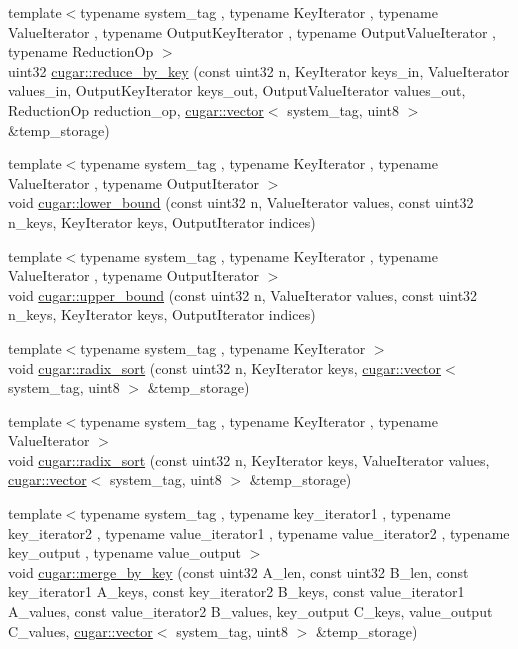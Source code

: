 \begin{DoxyCompactItemize}
\item 
{\footnotesize template$<$typename system\+\_\+tag , typename Key\+Iterator , typename Value\+Iterator , typename Output\+Key\+Iterator , typename Output\+Value\+Iterator , typename Reduction\+Op $>$ }\\uint32 \hyperlink{group___primitives_ga67aba73e3ceb623f48b734cb19889f1d}{cugar\+::reduce\+\_\+by\+\_\+key} (const uint32 n, Key\+Iterator keys\+\_\+in, Value\+Iterator values\+\_\+in, Output\+Key\+Iterator keys\+\_\+out, Output\+Value\+Iterator values\+\_\+out, Reduction\+Op reduction\+\_\+op, \hyperlink{structcugar_1_1vector}{cugar\+::vector}$<$ system\+\_\+tag, uint8 $>$ \&temp\+\_\+storage)
\item 
{\footnotesize template$<$typename system\+\_\+tag , typename Key\+Iterator , typename Value\+Iterator , typename Output\+Iterator $>$ }\\void \hyperlink{group___primitives_ga9dafac99df89cdd69ff33b9351e8cf7e}{cugar\+::lower\+\_\+bound} (const uint32 n, Value\+Iterator values, const uint32 n\+\_\+keys, Key\+Iterator keys, Output\+Iterator indices)
\item 
{\footnotesize template$<$typename system\+\_\+tag , typename Key\+Iterator , typename Value\+Iterator , typename Output\+Iterator $>$ }\\void \hyperlink{group___primitives_ga56b7c8a32a7a8a42afe413b087159230}{cugar\+::upper\+\_\+bound} (const uint32 n, Value\+Iterator values, const uint32 n\+\_\+keys, Key\+Iterator keys, Output\+Iterator indices)
\item 
{\footnotesize template$<$typename system\+\_\+tag , typename Key\+Iterator $>$ }\\void \hyperlink{group___primitives_gac4584fb9407d3d12ff3a4a1890e9b903}{cugar\+::radix\+\_\+sort} (const uint32 n, Key\+Iterator keys, \hyperlink{structcugar_1_1vector}{cugar\+::vector}$<$ system\+\_\+tag, uint8 $>$ \&temp\+\_\+storage)
\item 
{\footnotesize template$<$typename system\+\_\+tag , typename Key\+Iterator , typename Value\+Iterator $>$ }\\void \hyperlink{group___primitives_ga5b655f3d4ce7cf922eaf9ed446ab426b}{cugar\+::radix\+\_\+sort} (const uint32 n, Key\+Iterator keys, Value\+Iterator values, \hyperlink{structcugar_1_1vector}{cugar\+::vector}$<$ system\+\_\+tag, uint8 $>$ \&temp\+\_\+storage)
\item 
{\footnotesize template$<$typename system\+\_\+tag , typename key\+\_\+iterator1 , typename key\+\_\+iterator2 , typename value\+\_\+iterator1 , typename value\+\_\+iterator2 , typename key\+\_\+output , typename value\+\_\+output $>$ }\\void \hyperlink{group___primitives_gadbc27f73bf0312243aed32fc5610ac0d}{cugar\+::merge\+\_\+by\+\_\+key} (const uint32 A\+\_\+len, const uint32 B\+\_\+len, const key\+\_\+iterator1 A\+\_\+keys, const key\+\_\+iterator2 B\+\_\+keys, const value\+\_\+iterator1 A\+\_\+values, const value\+\_\+iterator2 B\+\_\+values, key\+\_\+output C\+\_\+keys, value\+\_\+output C\+\_\+values, \hyperlink{structcugar_1_1vector}{cugar\+::vector}$<$ system\+\_\+tag, uint8 $>$ \&temp\+\_\+storage)
\end{DoxyCompactItemize}


